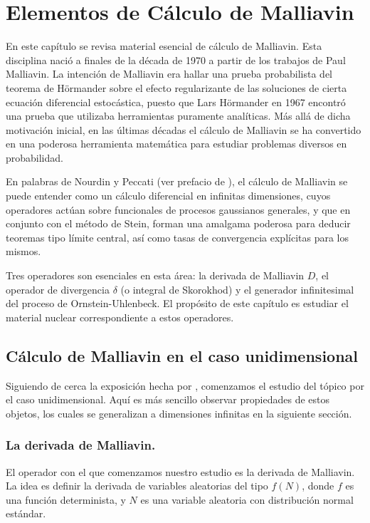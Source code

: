 \documentclass[letterpaper,twoside,12pt]{book}
\newcommand{\1}{\mathds{1}}
\theoremstyle{definition}
\theoremstyle{definition}
\theoremstyle{remark}
\theoremstyle{definition}
\theoremstyle{definition}
\theoremstyle{definition}
\theoremstyle{definition}
\theoremstyle{definition}
\begin{document}
\chapter{Elementos de Cálculo de Malliavin}%
En este capítulo se revisa material esencial de cálculo de Malliavin. Esta disciplina nació a finales de la década de 1970 a partir de los trabajos de Paul Malliavin. La intención de Malliavin era hallar una prueba probabilista del teorema de Hörmander sobre el efecto regularizante de las soluciones de cierta ecuación diferencial estocástica, puesto que Lars Hörmander en 1967 encontró una prueba que utilizaba herramientas puramente analíticas. Más allá de dicha motivación inicial, en las últimas décadas el cálculo de Malliavin se ha convertido en una poderosa herramienta matemática para estudiar problemas diversos en probabilidad. 

En palabras de Nourdin y Peccati (ver prefacio de \cite{Nourdin_Peccati_2012}), el cálculo de Malliavin se puede entender como un cálculo diferencial en infinitas dimensiones, cuyos operadores actúan sobre funcionales de procesos gaussianos generales, y que en conjunto con el método de Stein, forman una amalgama poderosa para deducir teoremas tipo límite central, así como tasas de convergencia explícitas para los mismos. 

Tres operadores son esenciales en esta área: la derivada de Malliavin $D$, el operador de divergencia $\delta$ (o integral de Skorokhod) y el generador infinitesimal del proceso de Ornstein-Uhlenbeck. El propósito de este capítulo es estudiar el material nuclear correspondiente a estos operadores.
\section{Cálculo de Malliavin en el caso unidimensional}
Siguiendo de cerca la exposición hecha por \cite{Nourdin_Peccati_2012}, comenzamos el estudio del tópico por el caso unidimensional. Aquí es más sencillo observar propiedades de estos objetos, los cuales se generalizan a dimensiones infinitas en la siguiente sección.

\subsection{La derivada de Malliavin.}

El operador con el que comenzamos nuestro estudio es la derivada de Malliavin. La idea es definir la derivada de variables aleatorias del tipo $f(N)$, donde $f$ es una función determinista, y $N$ es una variable aleatoria con distribución normal estándar.
\end{document}
